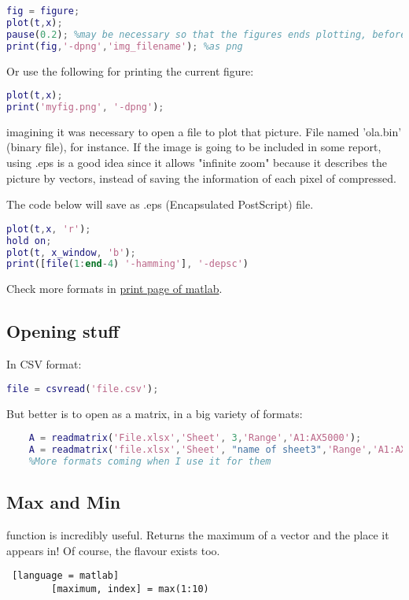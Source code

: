 \begin{lstlisting}[language=matlab,numbers=none]
fig = figure;
plot(t,x);
pause(0.2); %may be necessary so that the figures ends plotting, before it starts saving
print(fig,'-dpng','img_filename'); %as png
\end{lstlisting}

\par Or use the following for printing the current figure:
\begin{lstlisting}[language=matlab,numbers=none]
plot(t,x);
print('myfig.png', '-dpng');
\end{lstlisting}

\par {} imagining it was necessary to open a file to plot that picture. File named 'ola.bin' (binary file), for instance. If the image is going to be included in some report, using .eps is a good idea since it allows "infinite zoom" because it describes the picture by vectors, instead of saving the information of each pixel of compressed.
\par The code below will save as .eps (Encapsulated PostScript) file.
\begin{lstlisting}[language=matlab]
plot(t,x, 'r');
hold on;
plot(t, x_window, 'b');
print([file(1:end-4) '-hamming'], '-depsc')
\end{lstlisting}
\par Check more formats in \href{https://nl.mathworks.com/help/matlab/ref/print.html}{print page of matlab}.


\subsection{Opening stuff}
\par In CSV format:
\begin{lstlisting}[language=matlab]
file = csvread('file.csv');
\end{lstlisting}

\par But better is to open as a matrix, in a big variety of formats:
\begin{lstlisting}[language = matlab]
    %Excel
    A = readmatrix('File.xlsx','Sheet', 3,'Range','A1:AX5000');
    A = readmatrix('file.xlsx','Sheet', "name of sheet3",'Range','A1:AX5000');
    %More formats coming when I use it for them
\end{lstlisting}

\subsection{Max and Min}
\par {} function is incredibly useful. Returns the maximum of a vector and the place it appears in! Of course, the  flavour exists too.
    \begin{lstlisting} [language = matlab]
        [maximum, index] = max(1:10)
    \end{lstlisting}
    

